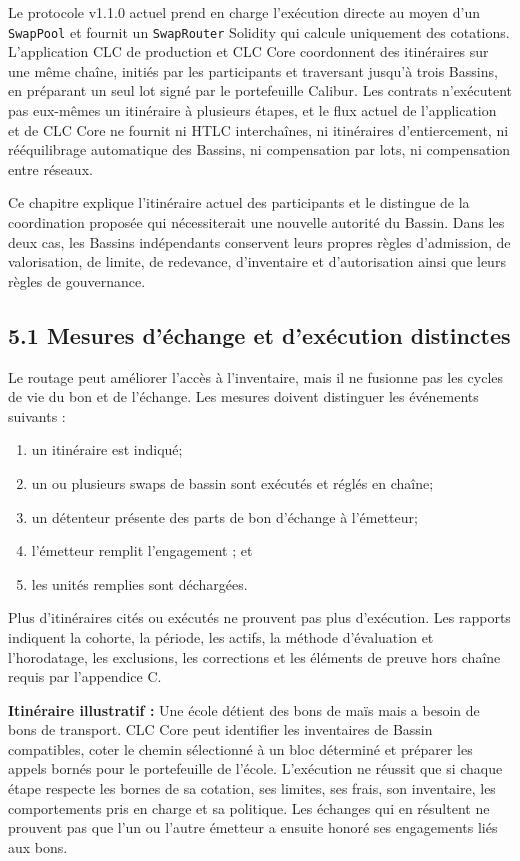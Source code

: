 \documentclass[11pt]{article}
\begin{document}
Le protocole v1.1.0 actuel prend en charge l'exécution directe au moyen d'un \texttt{SwapPool} et fournit un \texttt{SwapRouter} Solidity qui calcule uniquement des cotations. L'application CLC de production et CLC Core coordonnent des itinéraires sur une même chaîne, initiés par les participants et traversant jusqu'à trois Bassins, en préparant un seul lot signé par le portefeuille Calibur. Les contrats n'exécutent pas eux-mêmes un itinéraire à plusieurs étapes, et le flux actuel de l'application et de CLC Core ne fournit ni HTLC interchaînes, ni itinéraires d'entiercement, ni rééquilibrage automatique des Bassins, ni compensation par lots, ni compensation entre réseaux.

Ce chapitre explique l'itinéraire actuel des participants et le distingue de la coordination proposée qui nécessiterait une nouvelle autorité du Bassin. Dans les deux cas, les Bassins indépendants conservent leurs propres règles d'admission, de valorisation, de limite, de redevance, d'inventaire et d'autorisation ainsi que leurs règles de gouvernance.

\subsection*{5.1 Mesures d'échange et d'exécution distinctes}

Le routage peut améliorer l'accès à l'inventaire, mais il ne fusionne pas les cycles de vie du bon et de l'échange. Les mesures doivent distinguer les événements suivants :

\begin{enumerate}[leftmargin=*]
\item un itinéraire est indiqué;
\item un ou plusieurs swaps de bassin sont exécutés et réglés en chaîne;
\item un détenteur présente des parts de bon d'échange à l'émetteur;
\item l'émetteur remplit l'engagement ; et
\item les unités remplies sont déchargées.
\end{enumerate}
Plus d'itinéraires cités ou exécutés ne prouvent pas plus d'exécution. Les rapports indiquent la cohorte, la période, les actifs, la méthode d'évaluation et l'horodatage, les exclusions, les corrections et les éléments de preuve hors chaîne requis par l'appendice C.

\textbf{Itinéraire illustratif :} Une école détient des bons de maïs mais a besoin de bons de transport. CLC Core peut identifier les inventaires de Bassin compatibles, coter le chemin sélectionné à un bloc déterminé et préparer les appels bornés pour le portefeuille de l'école. L'exécution ne réussit que si chaque étape respecte les bornes de sa cotation, ses limites, ses frais, son inventaire, les comportements pris en charge et sa politique. Les échanges qui en résultent ne prouvent pas que l'un ou l'autre émetteur a ensuite honoré ses engagements liés aux bons.
\end{document}
